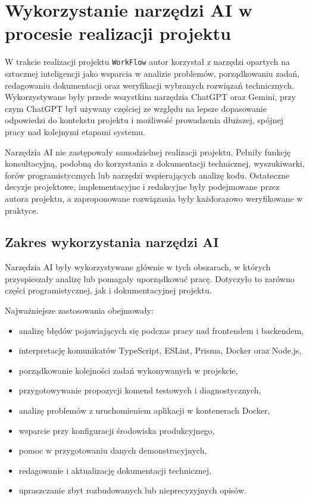 \section{Wykorzystanie narzędzi AI w procesie realizacji projektu}

W trakcie realizacji projektu \texttt{WorkFlow} autor korzystał z narzędzi opartych na sztucznej inteligencji jako wsparcia w analizie problemów, porządkowaniu zadań, redagowaniu dokumentacji oraz weryfikacji wybranych rozwiązań technicznych. Wykorzystywane były przede wszystkim narzędzia ChatGPT oraz Gemini, przy czym ChatGPT był używany częściej ze względu na lepsze dopasowanie odpowiedzi do kontekstu projektu i możliwość prowadzenia dłuższej, spójnej pracy nad kolejnymi etapami systemu.

Narzędzia AI nie zastępowały samodzielnej realizacji projektu. Pełniły funkcję konsultacyjną, podobną do korzystania z dokumentacji technicznej, wyszukiwarki, forów programistycznych lub narzędzi wspierających analizę kodu. Ostateczne decyzje projektowe, implementacyjne i redakcyjne były podejmowane przez autora projektu, a zaproponowane rozwiązania były każdorazowo weryfikowane w praktyce.

\subsection{Zakres wykorzystania narzędzi AI}

Narzędzia AI były wykorzystywane głównie w tych obszarach, w których przyspieszały analizę lub pomagały uporządkować pracę. Dotyczyło to zarówno części programistycznej, jak i dokumentacyjnej projektu.

Najważniejsze zastosowania obejmowały:
\begin{itemize}
    \item analizę błędów pojawiających się podczas pracy nad frontendem i backendem,
    \item interpretację komunikatów TypeScript, ESLint, Prisma, Docker oraz Node.js,
    \item porządkowanie kolejności zadań wykonywanych w projekcie,
    \item przygotowywanie propozycji komend testowych i diagnostycznych,
    \item analizę problemów z uruchomieniem aplikacji w kontenerach Docker,
    \item wsparcie przy konfiguracji środowiska produkcyjnego,
    \item pomoc w przygotowaniu danych demonstracyjnych,
    \item redagowanie i aktualizację dokumentacji technicznej,
    \item upraszczanie zbyt rozbudowanych lub nieprecyzyjnych opisów.
\end{itemize}

